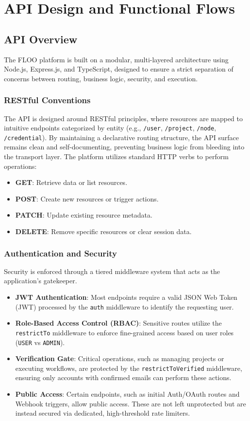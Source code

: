 \section{API Design and Functional Flows}
\subsection{API Overview}

The FLOO platform is built on a modular, multi-layered architecture using Node.js, Express.js, and TypeScript, designed to ensure a strict separation of concerns between routing, business logic, security, and execution.

\subsubsection{RESTful Conventions}
The API is designed around RESTful principles, where resources are mapped to intuitive endpoints categorized by entity (e.g., \texttt{/user}, \texttt{/project}, \texttt{/node}, \texttt{/credential}). By maintaining a declarative routing structure, the API surface remains clean and self-documenting, preventing business logic from bleeding into the transport layer. The platform utilizes standard HTTP verbs to perform operations:
\begin{itemize}
    \item \textbf{GET}: Retrieve data or list resources.
    \item \textbf{POST}: Create new resources or trigger actions.
    \item \textbf{PATCH}: Update existing resource metadata.
    \item \textbf{DELETE}: Remove specific resources or clear session data.
\end{itemize}

\subsubsection{Authentication and Security}
Security is enforced through a tiered middleware system that acts as the application's gatekeeper.
\begin{itemize}
    \item \textbf{JWT Authentication}: Most endpoints require a valid JSON Web Token (JWT) processed by the \texttt{auth} middleware to identify the requesting user.
    \item \textbf{Role-Based Access Control (RBAC)}: Sensitive routes utilize the \texttt{restrictTo} middleware to enforce fine-grained access based on user roles (\texttt{USER} vs \texttt{ADMIN}).
    \item \textbf{Verification Gate}: Critical operations, such as managing projects or executing workflows, are protected by the \texttt{restrictToVerified} middleware, ensuring only accounts with confirmed emails can perform these actions.
    \item \textbf{Public Access}: Certain endpoints, such as initial Auth/OAuth routes and Webhook triggers, allow public access. These are not left unprotected but are instead secured via dedicated, high-threshold rate limiters.
\end{itemize}

